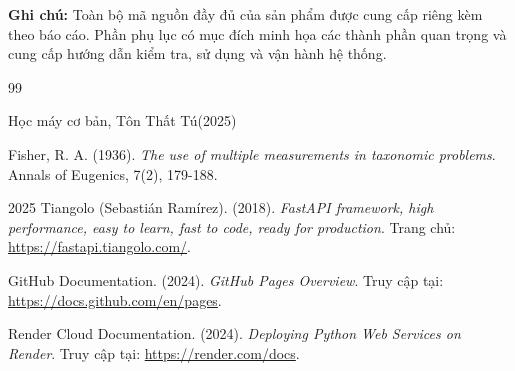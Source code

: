 \documentclass[14pt]{extarticle}
\begin{document}
	
	
	\noindent
	\textbf{Ghi chú:} Toàn bộ mã nguồn đầy đủ của sản phẩm được cung cấp
	riêng kèm theo báo cáo. Phần phụ lục có mục đích minh họa các thành phần
	quan trọng và cung cấp hướng dẫn kiểm tra, sử dụng và vận hành hệ thống.
	
	
	\renewcommand{\refname}{TÀI LIỆU THAM KHẢO}
	
	\begin{thebibliography}{99}
		
		Học máy cơ bản, Tôn Thất Tú(2025) 
	
		Fisher, R. A. (1936). 
		\textit{The use of multiple measurements in taxonomic problems}. 
		Annals of Eugenics, 7(2), 179-188.
		
		2025
		Tiangolo (Sebastián Ramírez). (2018). 
		\textit{FastAPI framework, high performance, easy to learn, fast to code, ready for production}. 
		Trang chủ: \url{https://fastapi.tiangolo.com/}.
		
		GitHub Documentation. (2024). 
		\textit{GitHub Pages Overview}. 
		Truy cập tại: \url{https://docs.github.com/en/pages}.
		
		Render Cloud Documentation. (2024). 
		\textit{Deploying Python Web Services on Render}. 
		Truy cập tại: \url{https://render.com/docs}.
		
	\end{thebibliography}
	
	
\end{document}
